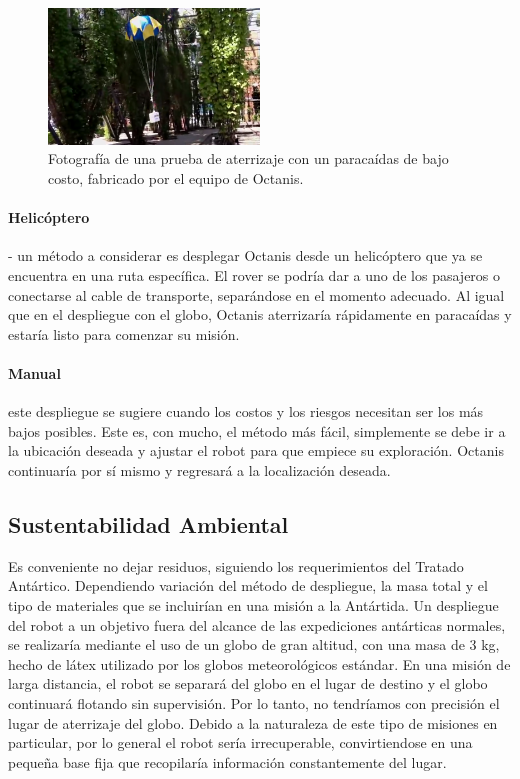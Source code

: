 \documentclass[a4paper,12pt]{article}
\begin{document}
\begin{figure}[h!]
	\centering
    \includegraphics[width=0.5\textwidth]{lowcostchute}
    \caption{Fotografía de una prueba de aterrizaje con un paracaídas de bajo costo, fabricado por el equipo de Octanis.}
\end{figure}


\paragraph{Helicóptero} - un método a considerar es desplegar Octanis desde un helicóptero que ya se encuentra en una ruta específica. El rover se podría dar a uno de los pasajeros o conectarse al cable de transporte, separándose en el momento adecuado. Al igual que en el despliegue con el globo, Octanis aterrizaría rápidamente en paracaídas y estaría listo para comenzar su misión.


\paragraph{Manual} este despliegue se sugiere cuando los costos y los riesgos necesitan ser los más bajos posibles. Este es, con mucho, el método más fácil, simplemente se debe ir a la ubicación deseada y ajustar el robot para que empiece su exploración. Octanis continuaría por sí mismo y regresará a la localización deseada.



\subsection{Sustentabilidad Ambiental}
Es conveniente no dejar residuos, siguiendo los requerimientos del Tratado Antártico. Dependiendo variación del método de despliegue, la masa total y el tipo de materiales que se incluirían en una misión a la Antártida. Un despliegue del robot a un objetivo fuera del alcance de las expediciones antárticas normales, se realizaría mediante el uso de un globo de gran altitud, con una masa de 3 kg, hecho de látex utilizado por los globos meteorológicos estándar. En una misión de larga distancia, el robot se separará del globo en el lugar de destino y el globo continuará flotando sin supervisión. Por lo tanto, no tendríamos con precisión el lugar de aterrizaje del globo. Debido a la naturaleza de este tipo de misiones en particular, por lo general el robot sería irrecuperable, convirtiendose en una pequeña base fija que recopilaría información constantemente del lugar.
\end{document}
